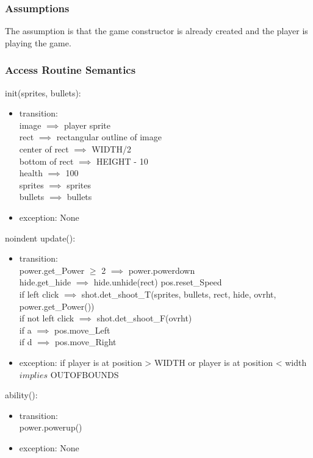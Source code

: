 \documentclass[12pt, titlepage]{article}
\begin{document}
\subsubsection {Assumptions}
The assumption is that the game constructor is already created and the player is playing the game.

\subsubsection {Access Routine Semantics}

\noindent init(sprites, bullets): 
\begin{itemize}
\item transition:\\
image $\implies$ player sprite\\
rect $\implies$ rectangular outline of image\\
center of rect $\implies$ WIDTH/2\\
bottom of rect $\implies$ HEIGHT - 10\\
health $\implies$ 100\\
sprites $\implies$ sprites\\
bullets $\implies$ bullets\\
\item exception: None\\
\end{itemize}

noindent update(): 
\begin{itemize}
\item transition:\\
power.get\_Power $\geq$ 2 $\implies$ power.powerdown\\
hide.get\_hide $\implies$ hide.unhide(rect)
pos.reset\_Speed\\
if left click $\implies$ shot.det\_shoot\_T(sprites, bullets, rect, hide, ovrht, power.get\_Power())\\
if not left click $\implies$ shot.det\_shoot\_F(ovrht)\\
if a $\implies$ pos.move\_Left\\
if d $\implies$ pos.move\_Right\\

\item exception: if player is at position > WIDTH or player is at position < width $implies$ OUTOFBOUNDS\\
\end{itemize}

\noindent ability(): 
\begin{itemize}
\item transition:\\
power.powerup()\\
\item exception: None\\
\end{itemize}
\end{document}
